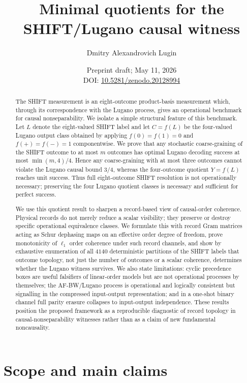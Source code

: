 \documentclass[11pt,a4paper]{article}
\title{Minimal quotients for the SHIFT/Lugano causal witness}
\author[1]{Dmitry Alexandrovich Lugin}
\affil[1]{Independent researcher (no institutional affiliation)}
\date{Preprint draft; May 11, 2026\\DOI: \href{https://doi.org/10.5281/zenodo.20128994}{10.5281/zenodo.20128994}}
\begin{document}
\maketitle

\begin{abstract}
The SHIFT measurement is an eight-outcome product-basis measurement which, through its correspondence with the Lugano process, gives an operational benchmark for causal nonseparability.  We isolate a simple structural feature of this benchmark.  Let $L$ denote the eight-valued SHIFT label and let $C=f(L)$ be the four-valued Lugano output class obtained by applying $f(0)=f(1)=0$ and $f(+)=f(-)=1$ componentwise.  We prove that any stochastic coarse-graining of the SHIFT outcome to at most $m$ outcomes has optimal Lugano decoding success at most $\min(m,4)/4$.  Hence any coarse-graining with at most three outcomes cannot violate the Lugano causal bound $3/4$, whereas the four-outcome quotient $Y=f(L)$ reaches unit success.  Thus full eight-outcome SHIFT resolution is not operationally necessary; preserving the four Lugano quotient classes is necessary and sufficient for perfect success.

We use this quotient result to sharpen a record-based view of causal-order coherence.  Physical records do not merely reduce a scalar visibility; they preserve or destroy specific operational equivalence classes.  We formulate this with record Gram matrices acting as Schur dephasing maps on an effective order degree of freedom, prove monotonicity of $\ell_1$ order coherence under such record channels, and show by exhaustive enumeration of all $4140$ deterministic partitions of the SHIFT labels that outcome topology, not just the number of outcomes or a scalar coherence, determines whether the Lugano witness survives.  We also state limitations: cyclic precedence boxes are useful falsifiers of linear-order models but are not operational processes by themselves; the AF-BW/Lugano process is operational and logically consistent but signalling in the compressed input-output representation; and in a one-shot binary channel full parity erasure collapses to input-output independence.  These results position the proposed framework as a reproducible diagnostic of record topology in causal-nonseparability witnesses rather than as a claim of new fundamental noncausality.
\end{abstract}


\section{Scope and main claims}
\label{sec:scope}
\end{document}
